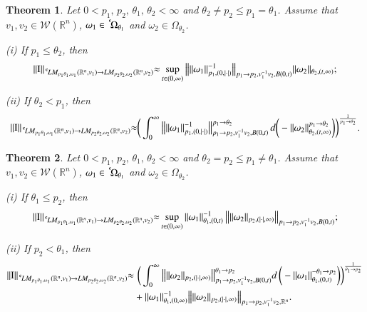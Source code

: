 \documentclass[11pt]{amsart}
\theoremstyle{plain}
\newtheorem{thm}{Theorem}[section]
\theoremstyle{definition}
\numberwithin{thm}{section}
\numberwithin{equation}{section}
\begin{document}
\begin{thm}\label{main02}
	Let $0 < p_1, \,p_2, \,{\theta}_1, \,{\theta}_2 < \infty$ and ${\theta}_2 \neq p_2 \leq p_1 = {\theta}_1$.  Assume that $v_1, v_2\in {{\mathcal W}}({{\mathbb R}^n})$, ${\omega}_1\in {\,^{^{\bf c}}\!}{{\Omega}_{{\theta}_1}}$ and ${\omega}_2 \in {\Omega}_{{\theta}_2}$.
	
	\rm{(i)} If $p_1\le {\theta}_2$, then
	\begin{equation*}
	\|{\operatorname{I}}\|_{{\,^{^{\bf c}}\!} LM_{p_1{\theta}_1,{\omega}_1}({{\mathbb R}^n},v_1){\rightarrow} LM_{p_2{\theta}_2,{\omega}_2}({{\mathbb R}^n},v_2)} {\approx} \sup_{t\in (0,\infty)}  \big\| \|{\omega}_1\|_{p_1,(0,|\cdot|)}^{-1} \big\|_{p_1 {\rightarrow}  p_2,v_1^{-1}v_2,B(0,t)} \|{\omega}_2\|_{{\theta}_2,(t,\infty)};
	\end{equation*}
	
	\rm{(ii)} If ${\theta}_2 < p_1$, then
	\begin{align*}
	\|{\operatorname{I}}\|_{{\,^{^{\bf c}}\!} LM_{p_1{\theta}_1,{\omega}_1}({{\mathbb R}^n},v_1){\rightarrow} LM_{p_2{\theta}_2,{\omega}_2}({{\mathbb R}^n},v_2)} 
	{\approx} \bigg(\int_0^{\infty} \big\| \|{\omega}_1\|_{p_1,(0,|\cdot|)}^{-1} \big\|_{p_1 {\rightarrow} p_2,v_1^{-1}v_2,B(0,t)}^{p_1{\rightarrow} {\theta}_2} \,d \bigg(-\|{\omega}_2\|_{{\theta}_2,(t,\infty)}^{p_1{\rightarrow} {\theta}_2} \bigg) \bigg)^{\frac{1}{p_1{\rightarrow} {\theta}_2}}.
	\end{align*}
\end{thm}

\begin{thm}\label{main03}
	Let $0<p_1, \,p_2, \,{\theta}_1, \,{\theta}_2 < \infty$ and ${\theta}_2 = p_2 \leq p_1 \neq {\theta}_1$. Assume that $v_1, v_2\in {{\mathcal W}}({{\mathbb R}^n})$, ${\omega}_1\in {\,^{^{\bf c}}\!}{{\Omega}_{{\theta}_1}}$ and ${\omega}_2 \in {\Omega}_{{\theta}_2}$.
	
	{\rm (i)} If ${\theta}_1 \le p_2$, then
	\begin{equation*}
	\|{\operatorname{I}}\|_{{\,^{^{\bf c}}\!} LM_{p_1{\theta}_1,{\omega}_1}({{\mathbb R}^n},v_1){\rightarrow} LM_{p_2{\theta}_2,{\omega}_2}({{\mathbb R}^n},v_2)}{\approx} 
	\sup_{t\in (0,\infty)} \|{\omega}_1\|_{{\theta}_1,(0,t)}^{-1} \, \big\| \|{\omega}_2\|_{p_2,(|\cdot|,\infty)} \big\|_{p_1{\rightarrow} p_2,v_1^{-1}v_2,B(0,t)};
	\end{equation*}
	
	{\rm (ii)} If $p_2 < {\theta}_1$, then
	\begin{align*}
	\|{\operatorname{I}}\|_{{\,^{^{\bf c}}\!} LM_{p_1{\theta}_1,{\omega}_1}({{\mathbb R}^n},v_1){\rightarrow} LM_{p_2{\theta}_2,{\omega}_2}({{\mathbb R}^n},v_2)}  {\approx} & \,\, \bigg(\int_0^\infty \big\| \|{\omega}_2\|_{p_2,(|\cdot|,\infty)} \big\|_{p_1{\rightarrow} p_2,v_1^{-1}v_2,B(0,t)}^{{\theta}_1{\rightarrow} p_2}  d\,\bigg(-\|{\omega}_1\|_{{\theta}_1,(0,t)}^{-{\theta}_1{\rightarrow} p_2}\bigg)\bigg)^{\frac{1}{{\theta}_1{\rightarrow} p_2}} \\
	& + \|{\omega}_1\|_{{\theta}_1,(0,\infty)}^{-1} \big\| \|{\omega}_2\|_{p_2,(|\cdot|,\infty)}\big\|_{p_1{\rightarrow} p_2,v_1^{-1}v_2,{{\mathbb R}^n}}.
	\end{align*}
\end{thm}
\end{document}

